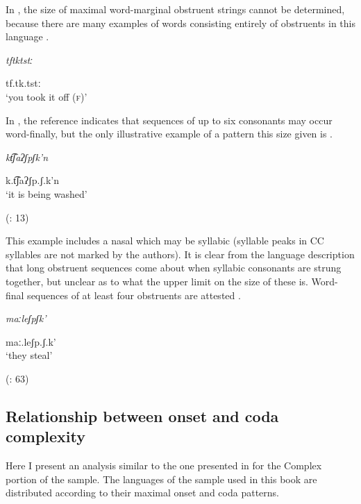   In , the size of maximal word-marginal obstruent strings cannot be determined, because there are many examples of words consisting entirely of obstruents in this language . 

\ea\label{ex:3.12}

\textit{tftktstː}

tf.tk.tstː\\
\glt ‘you took it off (\textsc{f})’
\citep[332]{Ridouane2008}
\z

In , the reference indicates that sequences of up to six consonants may occur word-finally, but the only illustrative example of a pattern this size given is .

\ea\label{ex:3.13}

\textit{kt͡ʃaʔʃpʃk’n}

k.t͡ʃaʔʃp.ʃ.k’n\\
\glt ‘it is being washed’

(\citealt{FernándezGarayHernández2006}: 13)
\z

This example includes a nasal which may be syllabic (syllable peaks in CC syllables are not marked by the authors). It is clear from the language description that long obstruent sequences come about when syllabic consonants are strung together, but unclear as to what the upper limit on the size of these is. Word-final sequences of at least four obstruents are attested .

\ea\label{ex:3.14}

\textit{maːleʃpʃk’}

maː.leʃp.ʃ.k’\\
\glt ‘they steal’

(\citealt{FernándezGarayHernández2006}: 63)
\z

\subsection{Relationship between onset and coda complexity}\label{sec:3.3.2}

  Here I present an analysis similar to the one presented in  for the Complex portion of the \citet{Maddieson2013a} sample. The languages of the sample used in this book are distributed according to their maximal onset and coda patterns.

